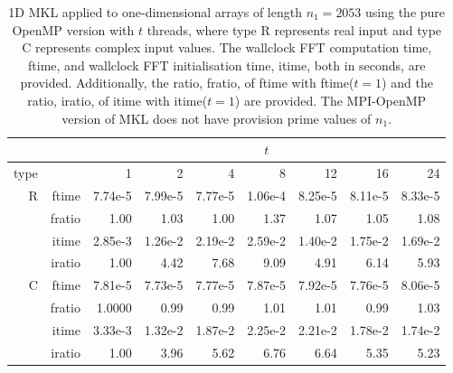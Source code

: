 \documentclass[a4]{article}
\begin{document}
\begin{table}
\begin{center}
\begin{tabular}{|r|r|r|r|r|r|r|r|r|}
\hline 
     &  & \multicolumn{7}{c|}{$t$} \\ \hline
    type  &  & 1           & 2    & 4    & 8    & 12   & 16    & 24  \\ \hline\hline
    R  & ftime &  7.74e-5 &   7.99e-5 &   7.77e-5 &   1.06e-4 &  8.25e-5 &   8.11e-5 &   8.33e-5    \\ 
      & fratio & 1.00 &   1.03 &   1.00 &   1.37 &   1.07 &   1.05 &   1.08     \\ 
     & itime &    2.85e-3 &   1.26e-2 &   2.19e-2 &   2.59e-2 &   1.40e-2 &   1.75e-2 &   1.69e-2     \\ 
     & iratio &   1.00 &   4.42 &   7.68 &   9.09 &   4.91 &   6.14 &   5.93    \\ \hline
    C & ftime &  7.81e-5 &   7.73e-5 &   7.77e-5 &   7.87e-5 &   7.92e-5 &   7.76e-5 &   8.06e-5   \\
      & fratio & 1.0000 &   0.99 &   0.99 &   1.01 &   1.01 &   0.99 &   1.03  \\
      & itime &  3.33e-3 &   1.32e-2 &   1.87e-2 &   2.25e-2 &   2.21e-2 &   1.78e-2 &   1.74e-2  \\
      & iratio & 1.00 &   3.96 &   5.62 &   6.76 &   6.64 &   5.35 &   5.23   \\ \hline
\end{tabular}
\caption{1D MKL applied to one-dimensional arrays of length $n_1=2053$ using the pure OpenMP version with $t$ threads, where type R represents real input and type C represents complex input values. The wallclock FFT computation time, ftime, and wallclock FFT initialisation time, itime, both in seconds, are provided. Additionally, the ratio, fratio, of ftime  with ftime($t=1$) and the ratio, iratio, of itime  with itime($t=1$) are provided. The MPI-OpenMP version of MKL does not have provision prime values of $n_1.$  }\label{Tbl:MKL1d2053}
\end{center}
\end{table}
\end{document}
